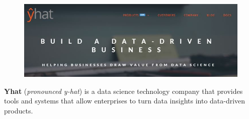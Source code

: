 \documentclass{beamer}
\begin{document}

\begin{frame}
	
\begin{figure}
\centering
\includegraphics[width=0.8\linewidth]{yhat}
\end{figure}
\Large
\textbf{Yhat} (\textit{pronounced y-hat}) is a data science technology company that provides tools and systems that allow enterprises to turn data insights into data-driven products.\\ \bigskip


\end{frame}
\end{document}
